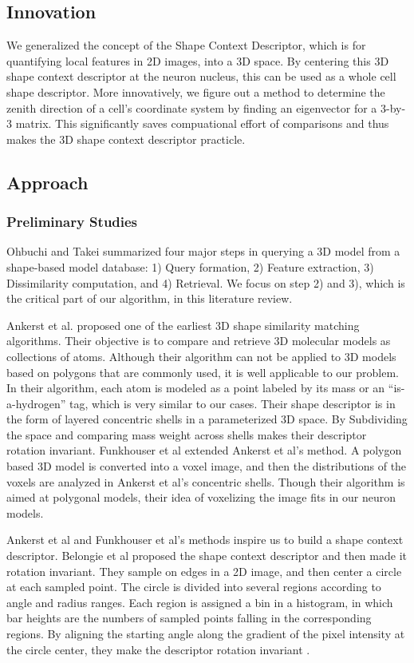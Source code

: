 \documentclass[letterpaper,11pt,oneside]{article}
\begin{document}
\subsection{Innovation}
We generalized the concept of the Shape Context Descriptor, which is for quantifying local features in 2D images, into a 3D space. By centering this 3D shape context descriptor at the neuron nucleus, this can be used as a whole cell shape descriptor. More innovatively, we figure out a method to determine the zenith direction of a cell's coordinate system by finding an eigenvector for a 3-by-3 matrix. This significantly saves compuational effort of  comparisons and thus makes the 3D shape context descriptor practicle. 

\subsection{Approach}

\subsubsection{Preliminary Studies}
Ohbuchi and Takei \cite{Ohbuchi03} summarized four major steps in querying a 3D model from a shape-based model database: 1) Query formation, 2) Feature extraction, 3) Dissimilarity computation, and 4) Retrieval. We focus on step 2) and 3), which is the critical part of our algorithm, in this literature review.

Ankerst et al. \cite{Ankerst99} proposed one of the earliest 3D shape similarity matching algorithms. Their objective is to compare and retrieve 3D molecular models as collections of atoms. Although their algorithm can not be applied to 3D models based on polygons that are commonly used, it is well applicable to our problem. In their algorithm, each atom is modeled as a point labeled by its mass or an ``is-a-hydrogen'' tag, which is very similar to our cases. Their shape descriptor is in the form of layered concentric shells in a parameterized 3D space. By Subdividing the space and comparing mass weight across shells makes their descriptor rotation invariant. Funkhouser et al  \cite{Funkhouser03} extended Ankerst et al's method. A polygon based 3D model is converted into a voxel image, and then the distributions of the voxels are analyzed in Ankerst et al's concentric shells. Though their algorithm is aimed at polygonal models, their idea of voxelizing the image fits in our neuron models.

Ankerst et al and Funkhouser et al's methods inspire us to build a shape context descriptor. Belongie et al \cite{Belongie00} proposed the shape context descriptor and then made it rotation invariant. They sample on edges in a 2D image, and then center a circle at each sampled point. The circle is divided into several regions according to angle and radius ranges. Each region is assigned a bin in a histogram, in which bar heights are the numbers of sampled points falling in the corresponding regions. By aligning the starting angle along the gradient of the pixel intensity at the circle center, they make the descriptor rotation invariant \cite{Belongie02}. 
\end{document}
